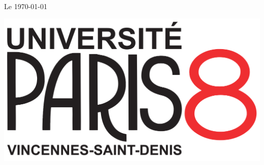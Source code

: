 \begin{titlepage}
    \begin{center}
        \makeatletter
            {\large \bfseries \@author } \vspace{0.5cm} %

            \@title \vspace{0.2cm} %

            {\large \bfseries \subtitle{}} \vspace{0.5cm} 

            Le \today
            \vspace{0.5cm}

            \includegraphics[scale=0.1]{logo.png} 
        \makeatother
    \end{center}
    \vspace*{\fill}
\end{titlepage}
{\let\cleardoublepage\relax \frontmatter}
